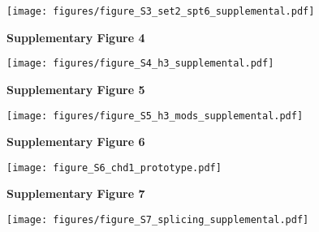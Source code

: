 \documentclass[9pt, letterpaper]{extarticle}
\begin{document}
{\centering \texttt{[image: figures/figure\_S3\_set2\_spt6\_supplemental.pdf]}\par}

\newpage

\textbf{\large Supplementary Figure 4}

{\centering \texttt{[image: figures/figure\_S4\_h3\_supplemental.pdf]}\par}

\newpage

\textbf{\large Supplementary Figure 5}

{\centering \texttt{[image: figures/figure\_S5\_h3\_mods\_supplemental.pdf]}\par}

\newpage

\textbf{\large Supplementary Figure 6}

{\centering \texttt{[image: figure\_S6\_chd1\_prototype.pdf]}\par}

\newpage

\textbf{\large Supplementary Figure 7}

{\centering \texttt{[image: figures/figure\_S7\_splicing\_supplemental.pdf]}\par}

\newpage
\end{document}
